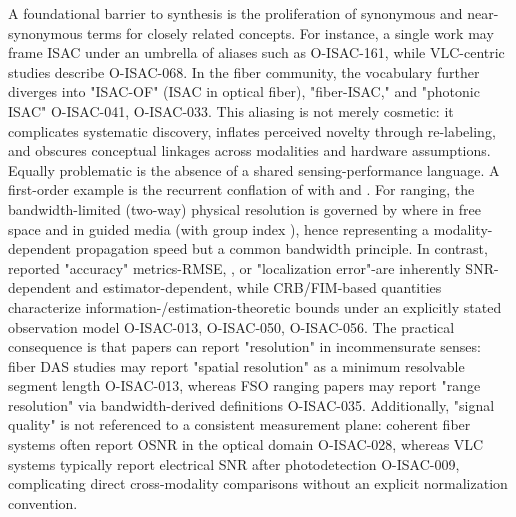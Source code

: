 {} A foundational barrier to synthesis is the proliferation of synonymous and near-synonymous terms for closely related concepts. For instance, a single work may frame ISAC under an umbrella of aliases such as  O-ISAC-161, while VLC-centric studies describe  O-ISAC-068. In the fiber community, the vocabulary further diverges into "ISAC-OF" (ISAC in optical fiber), "fiber-ISAC," and "photonic ISAC" O-ISAC-041, O-ISAC-033. This aliasing is not merely cosmetic: it complicates systematic discovery, inflates perceived novelty through re-labeling, and obscures conceptual linkages across modalities and hardware assumptions.\markdownRendererParagraphSeparator
{} Equally problematic is the absence of a shared sensing-performance language. A first-order example is the recurrent conflation of  with  and . For ranging, the bandwidth-limited (two-way) physical resolution is governed by\markdownRendererSoftLineBreak
{}\markdownRendererSoftLineBreak
{}where  in free space and  in guided media (with group index ), hence representing a modality-dependent propagation speed but a common bandwidth principle. In contrast, reported "accuracy" metrics-RMSE, , or "localization error"-are inherently SNR-dependent and estimator-dependent, while CRB/FIM-based quantities characterize information-/estimation-theoretic bounds under an explicitly stated observation model O-ISAC-013, O-ISAC-050, O-ISAC-056. The practical consequence is that papers can report "resolution" in incommensurate senses: fiber DAS studies may report "spatial resolution" as a minimum resolvable segment length O-ISAC-013, whereas FSO ranging papers may report "range resolution" via bandwidth-derived definitions O-ISAC-035. Additionally, "signal quality" is not referenced to a consistent measurement plane: coherent fiber systems often report OSNR in the optical domain O-ISAC-028, whereas VLC systems typically report electrical SNR after photodetection O-ISAC-009, complicating direct cross-modality comparisons without an explicit normalization convention.\markdownRendererParagraphSeparator
